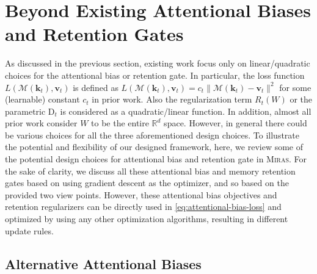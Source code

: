 \documentclass{article}
\newcommand{\framework}[0]{\textsc{Miras}}
\newcommand{\vk}[0]{\mathbf{k}}
\newcommand{\vvv}[0]{\mathbf{v}}
\newcommand{\M}[0]{\mathcal{M}}
\theoremstyle{plain}
\theoremstyle{definition}
\theoremstyle{remark}
\begin{document}
\section{Beyond Existing Attentional Biases and Retention Gates}\label{sec:beyond-variants}
As discussed in the previous section, existing work focus only on linear/quadratic choices for the attentional bias or retention gate. In particular, the loss function~$L(\M(\vk_t),\vvv_t)$ is defined as $L(\M(\vk_t),\vvv_t) = c_t\|\M(\vk_t)-\vvv_t\|^2$ for some (learnable) constant $c_t$ in prior work. Also the regularization term $R_t(W)$ or the parametric $\mbox{D}_t$ is considered as a quadratic/linear function. In addition, almost all prior work consider $W$ to be the entire $\mathbb{R}^d$ space. However, in general there could be various choices for all the three aforementioned design choices. To illustrate the potential and flexibility of our designed framework, here, we review some of the potential design choices for attentional bias and retention gate in \framework. For the sake of clarity, we discuss all these attentional bias and memory retention gates based on using gradient descent as the optimizer, and so based on the provided two view points. However, these attentional bias objectives and retention regularizers can be directly used in \autoref{eq:attentional-bias-loss} and optimized by using any other optimization algorithms, resulting in different update rules.  


\subsection{Alternative Attentional Biases}
\end{document}
